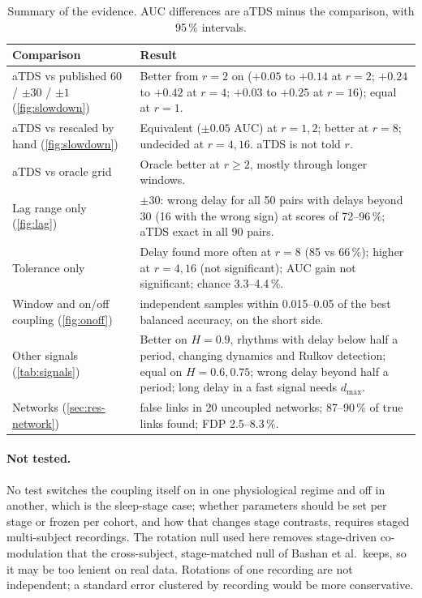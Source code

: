 \documentclass[11pt,a4paper]{article}
\begin{document}
\begin{table}[t]
\centering
\caption{Summary of the evidence. AUC differences are aTDS minus the comparison, with 95\,\% intervals.}
\label{tab:summary}
\footnotesize
\begin{tabularx}{\textwidth}{>{\raggedright\arraybackslash}p{4.2cm}>{\raggedright\arraybackslash}X}
\toprule
Comparison & Result \\
\midrule
aTDS vs published 60 / $\pm30$ / $\pm1$ (\cref{fig:slowdown}) & Better from $r = 2$ on ($+0.05$ to $+0.14$ at $r = 2$; $+0.24$ to $+0.42$ at $r = 4$; $+0.03$ to $+0.25$ at $r = 16$); equal at $r = 1$. \\
aTDS vs rescaled by hand (\cref{fig:slowdown}) & Equivalent ($\pm0.05$ AUC) at $r = 1, 2$; better at $r = 8$; undecided at $r = 4, 16$. aTDS is not told $r$. \\
aTDS vs oracle grid & Oracle better at $r \ge 2$, mostly through longer windows. \\
Lag range only (\cref{fig:lag}) & $\pm30$: wrong delay for all 50 pairs with delays beyond 30 (16 with the wrong sign) at scores of 72--96\,\%; aTDS exact in all 90 pairs. \\
Tolerance only & Delay found more often at $r = 8$ (85 vs 66\,\%); higher at $r = 4, 16$ (not significant); AUC gain not significant; chance 3.3--4.4\,\%. \\
Window and on/off coupling (\cref{fig:onoff}) & 30 independent samples within 0.015--0.05 of the best balanced accuracy, on the short side. \\
Other signals (\cref{tab:signals}) & Better on $H = 0.9$, rhythms with delay below half a period, changing dynamics and Rulkov detection; equal on $H = 0.6, 0.75$; wrong delay beyond half a period; long delay in a fast signal needs $d_{\max}$. \\
Networks (\cref{sec:res-network}) & 0 false links in 20 uncoupled networks; 87--90\,\% of true links found; FDP 2.5--8.3\,\%. \\
\bottomrule
\end{tabularx}
\end{table}

\paragraph{Not tested.} No test switches the coupling itself on in one physiological regime and off in another, which is the sleep-stage case; whether parameters should be set per stage or frozen per cohort, and how that changes stage contrasts, requires staged multi-subject recordings. The rotation null used here removes stage-driven co-modulation that the cross-subject, stage-matched null of Bashan et al.\ keeps, so it may be too lenient on real data. Rotations of one recording are not independent; a standard error clustered by recording would be more conservative.
\end{document}

